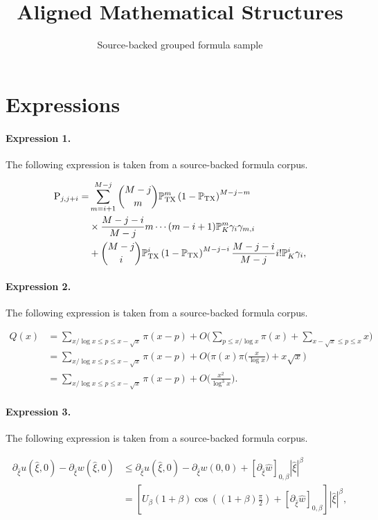 \documentclass[11pt]{article}
\title{Aligned Mathematical Structures}
\author{Source-backed grouped formula sample}
\date{}
\begin{document}
\maketitle
\section{Expressions}
\paragraph{Expression 1.} The following expression is taken from a source-backed formula corpus.

\begin{align*} {\rm P}_{j,j+i} =&\sum^{M-j}_{m=i+1} {M-j \choose m} \mathbb{P}_{\rm TX}^m \left(1- \mathbb{P}_{\rm TX}\right) ^{M-j-m} \\ &\times \frac{M-j-i}{M-j}m \cdots (m-i+1)\mathbb{P}_K^{m} \gamma_i \gamma_{m,i} \\ &+{M-j \choose i} \mathbb{P}_{\rm TX}^i \left(1- \mathbb{P}_{\rm TX}\right) ^{M-j-i} \frac{M-j-i}{M-j}i! \mathbb{P}_K^{i}\gamma_i , \end{align*}

\paragraph{Expression 2.} The following expression is taken from a source-backed formula corpus.

\begin{align*} Q(x) &= \sum_{x/\log x \le p \le x-\sqrt x} \pi(x-p) + O\bigg( \sum_{p\le x/\log x} \pi(x) + \sum_{x-\sqrt x\le p\le x} x \bigg) \\ &= \sum_{x/\log x \le p \le x-\sqrt x} \pi(x-p) + O\bigg( \pi(x) \pi\bigg( \frac x{\log x} \bigg) + x\sqrt x \bigg) \\ &= \sum_{x/\log x \le p \le x-\sqrt x} \pi(x-p) + O\bigg( \frac{x^2}{\log^3x} \bigg). \end{align*}

\paragraph{Expression 3.} The following expression is taken from a source-backed formula corpus.

\begin{align*} \partial_{\hat \xi} u(\hat \xi, 0) - \partial_{\hat \xi} w(\hat \xi, 0) & \leq \partial_{\hat \xi} u(\hat \xi, 0) - \partial_{\hat \xi} w(0, 0) + [ \partial_{\hat \xi} \hat w]_{0,\beta} |\hat{\xi}|^\beta \\ & = \left[ U_\beta (1+\beta) \cos{((1+\beta) \frac{\pi}{2})} + [ \partial_{\hat \xi} \hat w]_{0,\beta} \right ] |\hat \xi|^\beta, \end{align*}
\end{document}
